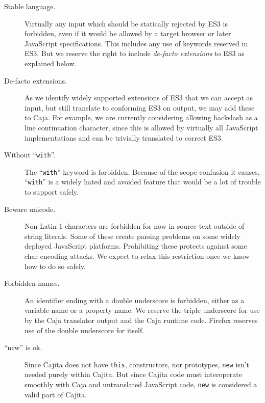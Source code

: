 \documentclass[letterpaper,twocolumn,10pt]{article}
\newcommand{\code}[1]{{\tt {#1}}}              %
\begin{document}
\begin{description}

    \item[Stable language.] Virtually any input which should be statically 
    rejected by ES3 is forbidden, even if it would be allowed by a target 
    browser or later JavaScript specifications. This includes any use of 
    keywords reserved in ES3. But we reserve the right to include 
    \emph{de-facto extensions} to ES3 as explained below.
    
    \item[De-facto extensions.] As we identify widely supported extensions of 
    ES3 that we can accept as input, but still translate to conforming ES3 on 
    output, we may add these to Caja. For example, we are currently 
    considering allowing backslash as a line continuation character, since 
    this is allowed by virtually all JavaScript implementations and can be 
    trivially translated to correct ES3.

    \item[Without ``\code{with}''.] The ``\code{with}'' keyword is forbidden. 
    Because of the scope confusion it causes, ``\code{with}'' is a widely 
    hated and avoided feature that would be a lot of trouble to support 
    safely.

    \item[Beware unicode.] Non-Latin-1 characters are forbidden for now in 
    source text outside of string literals. Some of these create parsing 
    problems on some widely deployed JavaScript platforms. Prohibiting these 
    protects against some char-encoding attacks. We expect to relax this 
    restriction once we know how to do so safely.

    \item[Forbidden names.] An identifier ending with a double underscore is 
    forbidden, either as a variable name or a property name. We reserve the 
    triple underscore for use by the Caja translator output and the Caja 
    runtime code. Firefox reserves use of the double underscore for itself.
    
    \item[``new'' is ok.] Since Cajita does not have \code{this}, 
    constructors, nor prototypes, \code{new} isn't needed purely within 
    Cajita. But since Cajita code must interoperate smoothly with Caja and 
    untranslated JavaScript code, \code{new} is considered a valid part of 
    Cajita.
        
\end{description}
\end{document}
